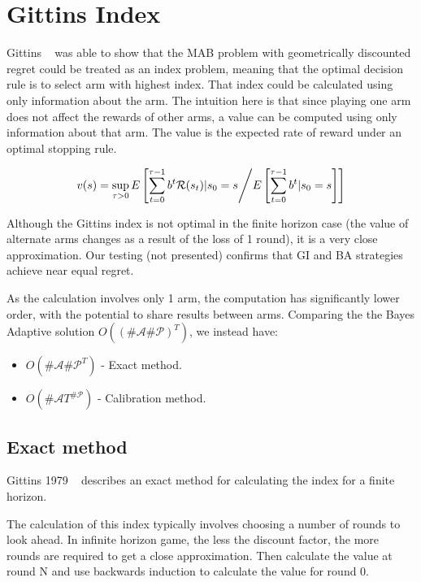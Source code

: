 \documentclass[11pt,a4,singlespacing,titlepagenumber=on]{scrreprt}
\numberwithin{equation}{chapter} %
\theoremstyle{remark}
\begin{document}
\section{ Gittins Index }

Gittins ~\cite{gittins1979bandit} was able to show that the MAB problem with geometrically discounted regret could be treated as an index problem, meaning that the optimal decision rule is to select arm with highest index. That index could be calculated using only information about the arm. The intuition here is that since playing one arm does not affect the rewards of other arms, a value can be computed using only information about that arm. The value is the expected rate of reward under an optimal stopping rule.

\begin{align}
v(s) = \sup_{\tau > 0} E\left[ \sum_{t=0}^{\tau-1} b^t \mathcal{R}(s_t) | s_0 = s  \middle/  E\left[ \sum_{t=0}^{\tau-1} b^t | s_0 = s \right]  \right]
\end{align}

Although the Gittins index is not optimal in the finite horizon case (the value of alternate arms changes as a result of the loss of 1 round), it is a very close approximation. Our testing (not presented) confirms that GI and BA strategies achieve near equal regret.

As the calculation involves only 1 arm, the computation has significantly lower order, with the potential to share results between arms. Comparing the the Bayes Adaptive solution $O((\#\mathcal{A} \#\mathcal{P})^T)$, we instead have:

\begin{itemize}
	\item $O(\#\mathcal{A} {\#\mathcal{P}}^T)$ - Exact method.
	\item $O(\#\mathcal{A} T^{\#\mathcal{P}})$ - Calibration method.
\end{itemize}

\subsection{ Exact method }

Gittins 1979 ~\cite{gittins1979bandit} describes an exact method for calculating the index for a finite horizon. 

The calculation of this index typically involves choosing a number of rounds to look ahead. In infinite horizon game, the less the discount factor, the more rounds are required to get a close approximation. Then calculate the value at round N and use backwards induction to calculate the value for round 0.
\end{document}

